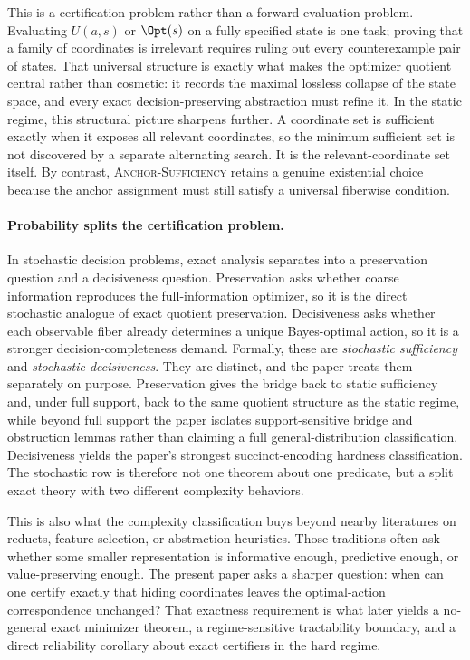 This is a certification problem rather than a forward-evaluation problem. Evaluating $U(a,s)$ or $\Opt(s)$ on a fully specified state is one task; proving that a family of coordinates is irrelevant requires ruling out every counterexample pair of states. That universal structure is exactly what makes the optimizer quotient central rather than cosmetic: it records the maximal lossless collapse of the state space, and every exact decision-preserving abstraction must refine it. In the static regime, this structural picture sharpens further. A coordinate set is sufficient exactly when it exposes all relevant coordinates, so the minimum sufficient set is not discovered by a separate alternating search. It is the relevant-coordinate set itself. By contrast, \textsc{Anchor-Sufficiency} retains a genuine existential choice because the anchor assignment must still satisfy a universal fiberwise condition.

\paragraph{Probability splits the certification problem.}
In stochastic decision problems, exact analysis separates into a preservation question and a decisiveness question. Preservation asks whether coarse information reproduces the full-information optimizer, so it is the direct stochastic analogue of exact quotient preservation. Decisiveness asks whether each observable fiber already determines a unique Bayes-optimal action, so it is a stronger decision-completeness demand. Formally, these are \emph{stochastic sufficiency} and \emph{stochastic decisiveness}. They are distinct, and the paper treats them separately on purpose. Preservation gives the bridge back to static sufficiency and, under full support, back to the same quotient structure as the static regime, while beyond full support the paper isolates support-sensitive bridge and obstruction lemmas rather than claiming a full general-distribution classification. Decisiveness yields the paper's strongest succinct-encoding hardness classification. The stochastic row is therefore not one theorem about one predicate, but a split exact theory with two different complexity behaviors.

This is also what the complexity classification buys beyond nearby literatures on reducts, feature selection, or abstraction heuristics. Those traditions often ask whether some smaller representation is informative enough, predictive enough, or value-preserving enough. The present paper asks a sharper question: when can one certify exactly that hiding coordinates leaves the optimal-action correspondence unchanged? That exactness requirement is what later yields a no-general exact minimizer theorem, a regime-sensitive tractability boundary, and a direct reliability corollary about exact certifiers in the hard regime.

